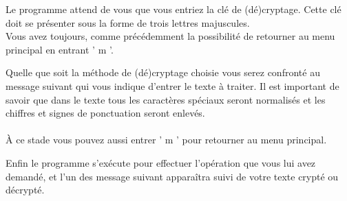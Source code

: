 \documentclass[a4paper,12pt,abstracton,titlepage]{scrartcl}
\begin{document}
\vspace{0.5cm}
{
\label{FE}
}
\vspace{0.5cm}

Le programme attend de vous que vous entriez la clé de (dé)cryptage. Cette clé doit se présenter sous la forme de trois lettres majuscules.\\
Vous avez toujours, comme précédemment la possibilité de retourner au menu principal en entrant ' m '.
\vspace{1cm}

Quelle que soit la méthode de (dé)cryptage choisie vous serez confronté au message suivant qui vous indique d'entrer le texte à traiter. Il est important de savoir que dans le texte tous les caractères spéciaux seront normalisés et les chiffres et signes de ponctuation seront enlevés.\\
\\
À ce stade vous pouvez aussi entrer ' m ' pour retourner au menu principal.

\vspace{0.5cm}
{
\label{FIT}
}
\vspace{0.5cm}

\newpage
Enfin le programme s'exécute pour effectuer l'opération que vous lui avez demandé, et l'un des message suivant apparaîtra suivi de votre texte crypté ou décrypté.

\vspace{0.5cm}
{
\label{FSCT}
\vspace{0.7cm}
\label{FSDT}
}
\vspace{0.7cm}
\end{document}
